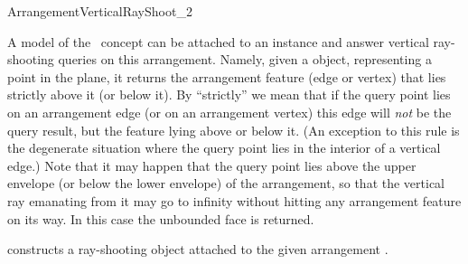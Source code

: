 
\ccRefPageBegin

\begin{ccRefConcept}{ArrangementVerticalRayShoot_2}

\ccDefinition

A model of the \ccRefName\ concept can be attached to an 
instance and answer vertical ray-shooting queries on this arrangement.
Namely, given a  object, representing a point in
the plane, it returns the arrangement feature (edge or vertex) that lies
strictly above it (or below it). By ``strictly'' we mean that if the
query point lies on an arrangement edge (or on an arrangement vertex) this
edge will {\em not} be the query result, but the feature lying above or
below it. (An exception to this rule is the degenerate situation where the
query point lies in the interior of a vertical edge.) Note that it may happen
that the query point lies above the upper envelope (or below the lower
envelope) of the arrangement, so that the vertical ray emanating from it
may go to infinity without hitting any arrangement feature on its way. In this
case the unbounded face is returned.

\ccTypes



\ccCreation
{}


  {constructs a ray-shooting object \ccVar{} attached to the given
   arrangement .}

\ccQueryFunctions


\end{ccRefConcept}
